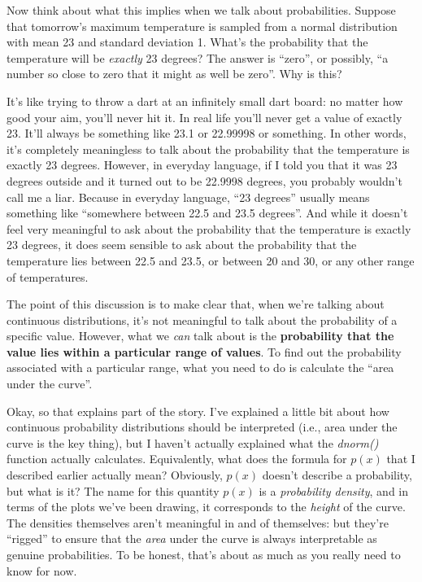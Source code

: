 \documentclass[
]{book}
\begin{document}
Now think about what this implies when we talk about probabilities. Suppose that tomorrow's maximum temperature is sampled from a normal distribution with mean 23 and standard deviation 1. What's the probability that the temperature will be \emph{exactly} 23 degrees? The answer is ``zero'', or possibly, ``a number so close to zero that it might as well be zero''. Why is this?

It's like trying to throw a dart at an infinitely small dart board: no matter how good your aim, you'll never hit it. In real life you'll never get a value of exactly 23. It'll always be something like 23.1 or 22.99998 or something. In other words, it's completely meaningless to talk about the probability that the temperature is exactly 23 degrees. However, in everyday language, if I told you that it was 23 degrees outside and it turned out to be 22.9998 degrees, you probably wouldn't call me a liar. Because in everyday language, ``23 degrees'' usually means something like ``somewhere between 22.5 and 23.5 degrees''. And while it doesn't feel very meaningful to ask about the probability that the temperature is exactly 23 degrees, it does seem sensible to ask about the probability that the temperature lies between 22.5 and 23.5, or between 20 and 30, or any other range of temperatures.

The point of this discussion is to make clear that, when we're talking about continuous distributions, it's not meaningful to talk about the probability of a specific value. However, what we \emph{can} talk about is the \textbf{probability that the value lies within a particular range of values}. To find out the probability associated with a particular range, what you need to do is calculate the ``area under the curve''.

Okay, so that explains part of the story. I've explained a little bit about how continuous probability distributions should be interpreted (i.e., area under the curve is the key thing), but I haven't actually explained what the \emph{dnorm()} function actually calculates. Equivalently, what does the formula for \(p(x)\) that I described earlier actually mean? Obviously, \(p(x)\) doesn't describe a probability, but what is it? The name for this quantity \(p(x)\) is a \emph{probability density}, and in terms of the plots we've been drawing, it corresponds to the \emph{height} of the curve. The densities themselves aren't meaningful in and of themselves: but they're ``rigged'' to ensure that the \emph{area} under the curve is always interpretable as genuine probabilities. To be honest, that's about as much as you really need to know for now.
\end{document}
